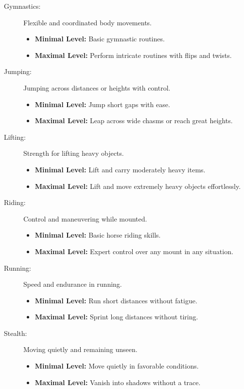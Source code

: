 \begin{description}
    \item[Gymnastics:] Flexible and coordinated body movements.
        \begin{itemize}
            \item \textbf{Minimal Level:} Basic gymnastic routines.
            \item \textbf{Maximal Level:} Perform intricate routines with flips and twists.
        \end{itemize}

    \item[Jumping:] Jumping across distances or heights with control.
        \begin{itemize}
            \item \textbf{Minimal Level:} Jump short gaps with ease.
            \item \textbf{Maximal Level:} Leap across wide chasms or reach great heights.
        \end{itemize}

    \item[Lifting:] Strength for lifting heavy objects.
        \begin{itemize}
            \item \textbf{Minimal Level:} Lift and carry moderately heavy items.
            \item \textbf{Maximal Level:} Lift and move extremely heavy objects effortlessly.
        \end{itemize}

    \item[Riding:] Control and maneuvering while mounted.
        \begin{itemize}
            \item \textbf{Minimal Level:} Basic horse riding skills.
            \item \textbf{Maximal Level:} Expert control over any mount in any situation.
        \end{itemize}

    \item[Running:] Speed and endurance in running.
        \begin{itemize}
            \item \textbf{Minimal Level:} Run short distances without fatigue.
            \item \textbf{Maximal Level:} Sprint long distances without tiring.
        \end{itemize}

    \item[Stealth:] Moving quietly and remaining unseen.
        \begin{itemize}
            \item \textbf{Minimal Level:} Move quietly in favorable conditions.
            \item \textbf{Maximal Level:} Vanish into shadows without a trace.
        \end{itemize}


\end{description}

